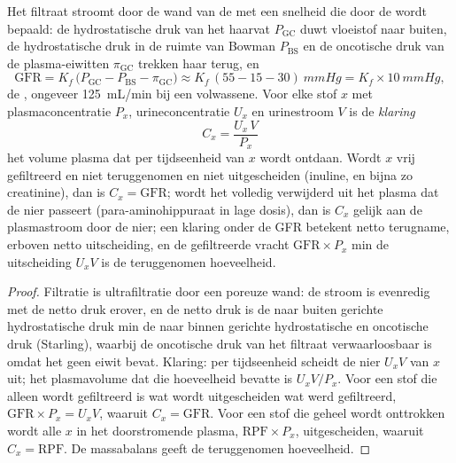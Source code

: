 \begin{theorem}\label{thm:b3:renal-osmoregulation:clearance}
Het filtraat stroomt door de wand van de  met een snelheid
die door de \emph{} wordt bepaald: de
hydrostatische druk van het haarvat $P_{\text{GC}}$ duwt vloeistof naar
buiten, de hydrostatische druk in de ruimte van Bowman $P_{\text{BS}}$
en de oncotische druk van de plasma-eiwitten $\pi_{\text{GC}}$ trekken
haar terug, en
\[
\text{GFR} = K_{f}\,\bigl(P_{\text{GC}} - P_{\text{BS}} - \pi_{\text{GC}}\bigr)
\approx K_{f}\,(55 - 15 - 30)\ \unit{mmHg} = K_{f}\times \qty{10}{mmHg},
\]
de \emph{}, ongeveer \qty{125}{mL/min}
bij een volwassene. Voor elke stof $x$ met plasmaconcentratie $P_{x}$,
urineconcentratie $U_{x}$ en urinestroom $V$ is de \emph{klaring}
\[
C_{x} = \frac{U_{x}\,V}{P_{x}}
\]
het volume plasma dat per tijdseenheid van $x$ wordt ontdaan. Wordt $x$
vrij gefiltreerd en niet teruggenomen en niet uitgescheiden (inuline,
en bijna zo creatinine), dan is $C_{x} = \text{GFR}$; wordt het
volledig verwijderd uit het plasma dat de nier passeert
(para-aminohippuraat in lage dosis), dan is $C_{x}$ gelijk aan de
plasmastroom door de nier; een klaring onder de GFR betekent netto
terugname, erboven netto uitscheiding, en de gefiltreerde vracht $\text{GFR}
\times P_{x}$ min de uitscheiding $U_{x}V$ is de teruggenomen
hoeveelheid.
\end{theorem}
\begin{proof}
Filtratie is ultrafiltratie door een poreuze wand: de stroom is
evenredig met de netto druk erover, en de netto druk is de naar buiten
gerichte hydrostatische druk min de naar binnen gerichte hydrostatische
en oncotische druk (Starling), waarbij de oncotische druk van het
filtraat verwaarloosbaar is omdat het geen eiwit bevat. Klaring: per
tijdseenheid scheidt de nier $U_{x}V$ van $x$ uit; het plasmavolume dat
die hoeveelheid bevatte is $U_{x}V/P_{x}$. Voor een stof die alleen
wordt gefiltreerd is wat wordt uitgescheiden wat werd gefiltreerd,
$\text{GFR}\times P_{x} = U_{x}V$, waaruit $C_{x} = \text{GFR}$. Voor
een stof die geheel wordt onttrokken wordt alle $x$ in het
doorstromende plasma, $\text{RPF}\times P_{x}$, uitgescheiden, waaruit
$C_{x} = \text{RPF}$. De massabalans geeft de teruggenomen hoeveelheid.
\end{proof}

